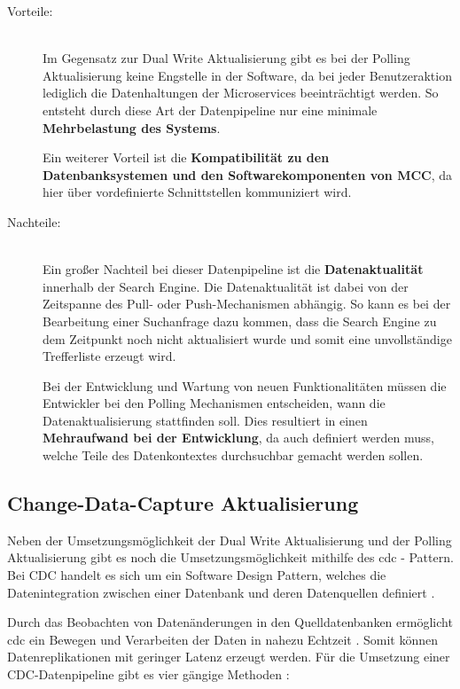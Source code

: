 \begin{description}
    \item[Vorteile:]\hfill \\
    Im Gegensatz zur Dual Write Aktualisierung gibt es bei der Polling Aktualisierung keine Engstelle in der Software, da bei jeder Benutzeraktion lediglich die Datenhaltungen der Microservices beeinträchtigt werden. So entsteht durch diese Art der Datenpipeline nur eine minimale \textbf{Mehrbelastung des Systems}.

    Ein weiterer Vorteil ist die \textbf{Kompatibilität zu den Datenbanksystemen und den Softwarekomponenten von MCC}, da hier über vordefinierte Schnittstellen kommuniziert wird.
    
    \item[Nachteile:]\hfill \\
    Ein großer Nachteil bei dieser Datenpipeline ist die \textbf{Datenaktualität} innerhalb der Search Engine. Die Datenaktualität ist dabei von der Zeitspanne des Pull- oder Push-Mechanismen abhängig. So kann es bei der Bearbeitung einer Suchanfrage dazu kommen, dass die Search Engine zu dem Zeitpunkt noch nicht aktualisiert wurde und somit eine unvollständige Trefferliste erzeugt wird.

    Bei der Entwicklung und Wartung von neuen Funktionalitäten müssen die Entwickler bei den Polling Mechanismen entscheiden, wann die Datenaktualisierung stattfinden soll. Dies resultiert in einen \textbf{Mehraufwand bei der Entwicklung}, da auch definiert werden muss, welche Teile des Datenkontextes \glqq durchsuchbar\grqq{} gemacht werden sollen.

\end{description}

\subsection{Change-Data-Capture Aktualisierung\label{subsec4.1.4:Unterunterpunkt-4}}

Neben der Umsetzungsmöglichkeit der Dual Write Aktualisierung und der Polling Aktualisierung gibt es noch die Umsetzungsmöglichkeit mithilfe des \gls{cdc} - Pattern. Bei CDC handelt es sich um ein Software Design Pattern, welches die Datenintegration zwischen einer Datenbank und deren Datenquellen definiert \cite{Datenbankenverstehen.de.2021}.

Durch das Beobachten von Datenänderungen in den Quelldatenbanken ermöglicht \gls{cdc} ein Bewegen und Verarbeiten der Daten in nahezu Echtzeit \cite{JohnKutay.2021}. Somit können Datenreplikationen mit geringer Latenz erzeugt werden. Für die Umsetzung einer CDC-Datenpipeline gibt es vier gängige Methoden \cite{MarkVandeWiel.2021}:


